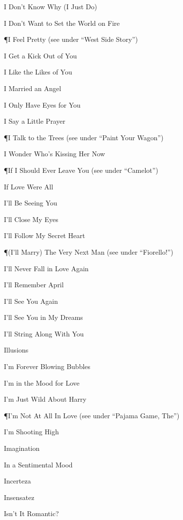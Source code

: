 \N I Don't Know Why (I Just Do)

\N I Don't Want to Set the World on Fire

\P I Feel Pretty
\nobreak
\T (see under ``West Side Story'')

\N I Get a Kick Out of You

\N I Like the Likes of You

\N I Married an Angel

\N I Only Have Eyes for You

\N I Say a Little Prayer

\P I Talk to the Trees
\nobreak
\T (see under ``Paint Your Wagon'')

\N I Wonder Who's Kissing Her Now

\P If I Should Ever Leave You
\nobreak
\T (see under ``Camelot'')

\N If Love Were All

\N I'll Be Seeing You

\N I'll Close My Eyes

\N I'll Follow My Secret Heart

\P (I'll Marry) The Very Next Man
\nobreak
\T (see under ``Fiorello!'')

\N I'll Never Fall in Love Again

\N I'll Remember April

\N I'll See You Again

\N I'll See You in My Dreams

\N I'll String Along With You

\N Illusions

\N I'm Forever Blowing Bubbles

\N {}

\N I'm in the Mood for Love

\N I'm Just Wild About Harry

\P I'm Not At All In Love
\nobreak
\T (see under ``Pajama Game, The'')

\N I'm Shooting High

\N Imagination

\N In a Sentimental Mood

\N Incerteza

\N Insensatez

\N Isn't It Romantic?

\N {}

